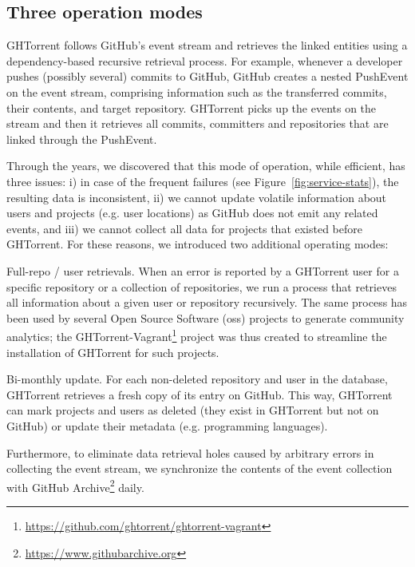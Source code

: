 \documentclass{sig-alternate}
\begin{document}
\subsection{Three operation modes}

GHTorrent follows GitHub's event stream and retrieves the linked entities using
a dependency-based recursive retrieval process. For example, whenever a
developer pushes (possibly several) commits to GitHub, GitHub creates a nested
PushEvent on the event stream, comprising information such as the transferred
commits, their contents, and target repository. GHTorrent picks up the events on
the stream and then it retrieves all commits, committers and repositories that
are linked through the PushEvent.

Through the years, we discovered that this mode of operation, while efficient,
has three issues: i) in case of the frequent failures (see
Figure~\ref{fig:service-stats}), the resulting data is inconsistent,
ii) we cannot update volatile information about users and projects (e.g. user
locations) as GitHub does not emit any related events, and
iii) we cannot collect all data for projects that existed before GHTorrent.
For these reasons, we introduced two additional operating modes:

\begin{compactdesc}

  \item[Full-repo / user retrievals.] When an error is reported by a GHTorrent
    user for a specific repository or a collection of repositories, we run a
    process that retrieves all information about a given user or repository
    recursively. The same process has been used by several Open Source Software
    ({\sc oss}) projects to generate community analytics; the
    GHTorrent-Vagrant\footnote{\url{https://github.com/ghtorrent/ghtorrent-vagrant}}
    project was thus created to streamline the installation of GHTorrent for
    such projects.

  \item[Bi-monthly update.] For each non-deleted repository and user in the
    database, GHTorrent retrieves a fresh copy of its entry on GitHub. This way,
    GHTorrent can mark projects and users as deleted (they exist in GHTorrent
    but not on GitHub) or update their metadata (e.g. programming
    languages).

\end{compactdesc}

Furthermore, to eliminate data retrieval holes caused by arbitrary errors in
collecting the event stream, we synchronize the contents of the event collection
with GitHub Archive\footnote{\url{https://www.githubarchive.org}} daily.
\end{document}
